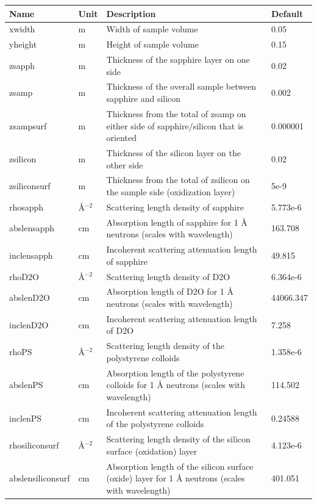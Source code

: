 \begin{longtable}{p{}p{}p{}p{}}
\toprule
\textbf{Name} & \textbf{Unit} & \textbf{Description} & \textbf{Default} \\
\midrule
\endhead
xwidth & m & Width of sample volume & 0.05 \\
yheight & m & Height of sample volume & 0.15 \\
zsapph & m & Thickness of the sapphire layer on one side & 0.02 \\
zsamp & m & Thickness of the overall sample between sapphire and silicon & 0.002 \\
zsampsurf & m & Thickness from the total of zsamp on either side of sapphire/silicon that is oriented & 0.000001 \\
zsilicon & m & Thickness of the silicon layer on the other side & 0.02 \\
zsiliconsurf & m & Thickness from the total of zsilicon on the sample side (oxidization layer) & 5e-9 \\
rhosapph & \AA{}$^{-2}$ & Scattering length density of sapphire & 5.773e-6 \\
abslensapph & cm & Absorption length of sapphire for 1 \AA{} neutrons (scales with wavelength) & 163.708 \\
inclensapph & cm & Incoherent scattering attenuation length of sapphire & 49.815 \\
rhoD2O & \AA{}$^{-2}$ & Scattering length density of D2O & 6.364e-6 \\
abslenD2O & cm & Absorption length of D2O for 1 \AA{} neutrons (scales with wavelength) & 44066.347 \\
inclenD2O & cm & Incoherent scattering attenuation length of D2O & 7.258 \\
rhoPS & \AA{}$^{-2}$ & Scattering length density of the polystyrene colloids & 1.358e-6 \\
abslenPS & cm & Absorption length of the polystyrene colloids for 1 \AA{} neutrons (scales with wavelength) & 114.502 \\
inclenPS & cm & Incoherent scattering attenuation length of the polystyrene colloids & 0.24588 \\
rhosiliconsurf & \AA{}$^{-2}$ & Scattering length density of the silicon surface (oxidation) layer & 4.123e-6 \\
abslensiliconsurf & cm & Absorption length of the silicon surface (oxide) layer for 1 \AA{} neutrons (scales with wavelength) & 401.051 \\

\end{longtable}

